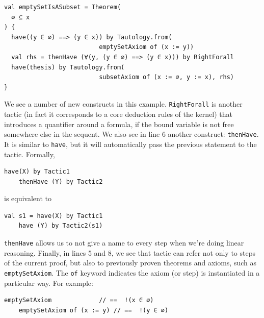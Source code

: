 \noindent
\begin{minipage}{\linewidth}\vspace{1em}
  \begin{lstlisting}[language=lisa, frame=single]
val emptySetIsASubset = Theorem(
  ∅ ⊆ x
) {
  have((y ∈ ∅) ==> (y ∈ x)) by Tautology.from(
                          emptySetAxiom of (x := y))
  val rhs = thenHave (∀(y, (y ∈ ∅) ==> (y ∈ x))) by RightForall
  have(thesis) by Tautology.from(
                          subsetAxiom of (x := ∅, y := x), rhs)
}
  \end{lstlisting}
\end{minipage}
We see a number of new constructs in this example. \lstinline|RightForall| is another tactic (in fact it corresponds to a core deduction rules of the kernel) that introduces a quantifier around a formula, if the bound variable is not free somewhere else in the sequent.
We also see in line 6 another construct: \lstinline|thenHave|. It is similar to \lstinline|have|, but it will automatically pass the previous statement to the tactic. Formally,
\noindent
\begin{minipage}{\linewidth}\vspace{1em}
  \begin{lstlisting}[language=lisa, frame=single]
    have(X) by Tactic1
    thenHave (Y) by Tactic2
  \end{lstlisting}
\end{minipage}
is equivalent to

\noindent
\begin{minipage}{\linewidth}\vspace{1em}
  \begin{lstlisting}[language=lisa, frame=single]
    val s1 = have(X) by Tactic1
    have (Y) by Tactic2(s1)
  \end{lstlisting}
\end{minipage}
\lstinline|thenHave| allows us to not give a name to every step when we're doing linear reasoning. Finally, in lines 5 and 8, we see that tactic can refer not only to steps of the current proof, but also to previously proven theorems and axioms, such as \lstinline|emptySetAxiom|. The \lstinline|of| keyword indicates the axiom (or step) is instantiated in a particular way. For example:
\noindent
\begin{minipage}{\linewidth}\vspace{1em}
  \begin{lstlisting}[language=lisa, frame=single]
    emptySetAxiom             // ==  !(x ∈ ∅)
    emptySetAxiom of (x := y) // ==  !(y ∈ ∅)
  \end{lstlisting}
\end{minipage}

